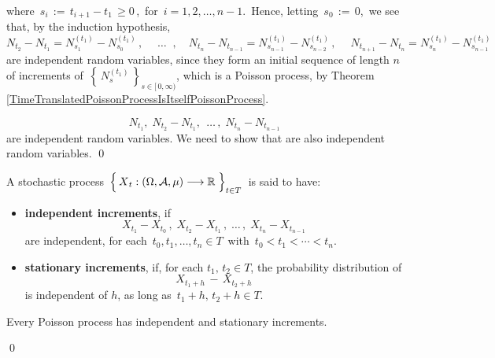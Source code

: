 where \,$s_{i} \,:=\, t_{i+1} - t_{1} \,\geq 0\,$,\,
for \,$i = 1, 2, \ldots, n-1$.\,
Hence, letting \,$s_{0} \,:=\, 0$,\, we see that, by the induction hypothesis,
\begin{equation*}
N_{t_{2}} - N_{t_{1}} = N^{(t_{1})}_{s_{1}} - N^{(t_{1})}_{s_{0}}\,,\;
\quad\ldots\;\;,\quad
N_{t_{n}} - N_{t_{n-1}} = N^{(t_{1})}_{s_{n-1}} - N^{(t_{1})}_{s_{n-2}}\,,\;
\quad
N_{t_{n+1}} - N_{t_{n}} = N^{(t_{1})}_{s_{n}} - N^{(t_{1})}_{s_{n-1}}
\end{equation*}
are independent random variables, since they form
an initial sequence of length $n$ of increments of
\,$\left\{\,N^{(t_{1})}_{s}\,\right\}_{s\in[\,0,\infty)}$,
which is a Poisson process,
by Theorem \ref{TimeTranslatedPoissonProcessIsItselfPoissonProcess}.


\begin{equation*}
N_{t_{1}},\;
N_{t_{2}} - N_{t_{1}},\;
\,\ldots\,,\;
N_{t_{n}} - N_{t_{n-1}}
\end{equation*}
are independent random variables.
We need to show that
are also independent random variables.
\qed


\vskip 0.5cm
\begin{definition}
\mbox{}
\vskip 0.1cm
\noindent
A stochastic process
\,$\left\{\,\overset{{\color{white}.}}{X}_{t} : (\Omega,\mathcal{A},\mu) \longrightarrow \Re \;\right\}_{t \in T}$\,
is said to have:
\begin{itemize}
\item
	\textbf{independent increments}, if
	\begin{equation*}
	X_{t_{1}} - X_{t_{0}}\,,\;
	X_{t_{2}} - X_{t_{1}}\,,\;
	\ldots\,,\;
	X_{t_{n}} - X_{t_{n-1}}
	\end{equation*}
	are independent, for each \,$t_{0}, t_{1}, \ldots, t_{n} \in T$\,
	with \,$t_{0} < t_{1} < \cdots < t_{n}$.
\item
	\textbf{stationary increments}, if,
	for each $t_{1},\, t_{2} \in T$, the probability distribution of
	\begin{equation*}
	X_{t_{1}+h} \,-\, X_{t_{2}+h}
	\end{equation*}
	is independent of $h$, as long as \,$t_{1} + h,\, t_{2} + h \in T$.
\end{itemize}
\end{definition}


\vskip 0.5cm
\begin{corollary}
\mbox{}
\vskip 0.15cm
\noindent
Every Poisson process has independent and stationary increments.
\end{corollary}
\proof

\qed


\renewcommand{\theenumi}{\roman{enumi}}
\renewcommand{\labelenumi}{\textnormal{(\theenumi)}$\;\;$}


